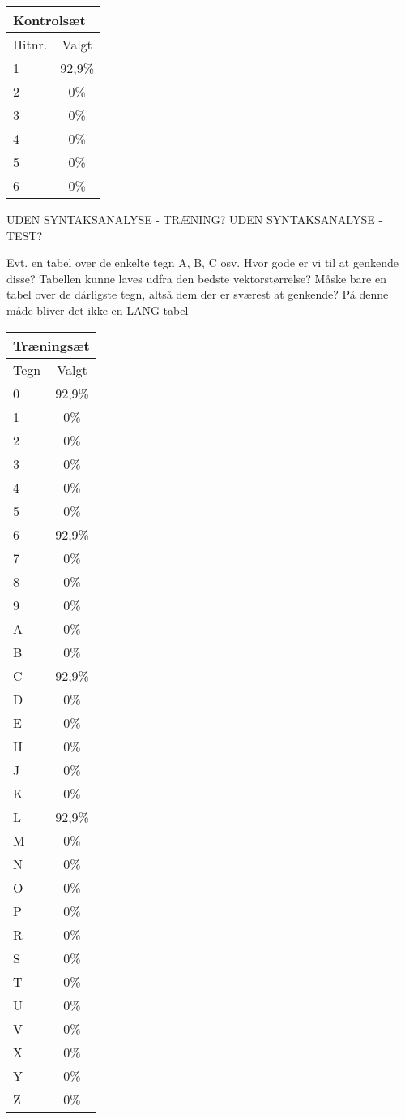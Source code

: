 \begin{tabular}{|l|c|}\hline
\multicolumn{2}{|l|}{Kontrolsæt} \\\hline
Hitnr. & Valgt \\\hline
1 & 92,9\% \\\hline
2 & 0\% \\\hline
3 & 0\% \\\hline
4 & 0\% \\\hline
5 & 0\% \\\hline
6 & 0\% \\\hline \end{tabular}

UDEN SYNTAKSANALYSE - TRÆNING?
UDEN SYNTAKSANALYSE - TEST?

Evt. en tabel over de enkelte tegn A, B, C osv. Hvor gode er vi til at genkende disse? Tabellen kunne laves udfra den bedste vektorstørrelse? Måske bare en tabel over de dårligste tegn, altså dem der er sværest at genkende? På denne måde bliver det ikke en LANG tabel

\begin{tabular}{|l|c|}\hline
\multicolumn{2}{|l|}{Træningsæt} \\\hline
Tegn & Valgt \\\hline
0 & 92,9\% \\\hline
1 & 0\% \\\hline
2 & 0\% \\\hline
3 & 0\% \\\hline
4 & 0\% \\\hline
5 & 0\% \\\hline
6 & 92,9\% \\\hline
7 & 0\% \\\hline
8 & 0\% \\\hline
9 & 0\% \\\hline
A & 0\% \\\hline
B & 0\% \\\hline
C & 92,9\% \\\hline
D & 0\% \\\hline
E & 0\% \\\hline
H & 0\% \\\hline
J & 0\% \\\hline
K & 0\% \\\hline 
L & 92,9\% \\\hline
M & 0\% \\\hline
N & 0\% \\\hline
O & 0\% \\\hline
P & 0\% \\\hline
R & 0\% \\\hline
S & 0\% \\\hline
T & 0\% \\\hline
U & 0\% \\\hline
V & 0\% \\\hline
X & 0\% \\\hline
Y & 0\% \\\hline
Z & 0\% \\\hline \end{tabular}



